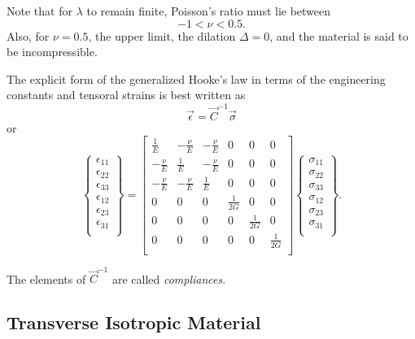 Note that for $\lambda$ to remain finite, Poisson's ratio must lie between
\begin{equation*}
  -1 < \nu < \num{0,5} 
.\end{equation*}
Also, for $\nu = \num{0,5}$, the upper limit, the dilation $\Delta = 0$, and the material is said to be incompressible.

The explicit form of the generalized Hooke's law in terms of the engineering constants and tensoral strains is best written as
\begin{equation*}
  \Vec{\epsilon} = \Vec{C}^{-1} \Vec{\sigma}
\end{equation*}
or
\begin{equation*}
  \left\{ \begin{array}{cccccc}
    \epsilon_{11}\\
  \epsilon_{22}\\
  \epsilon_{33}\\
  \epsilon_{12}\\
  \epsilon_{23}\\
  \epsilon_{31}\\
  \end{array} \right\} = \begin{bmatrix}
    \frac{1}{E} & - \frac{\nu}{E} & - \frac{\nu}{E} & 0 & 0 & 0\\
  - \frac{\nu}{E} & \frac{1}{E} & - \frac{\nu}{E} & 0 & 0 & 0\\
  -\frac{\nu}{E} & -\frac{\nu}{E} & \frac{1}{E} & 0 & 0 & 0\\
  0 & 0 & 0 & \frac{1}{2G} & 0 & 0\\
  0 & 0 & 0 & 0 & \frac{1}{2G} & 0\\
  0 & 0 & 0 & 0 & 0 & \frac{1}{2G}\\
  \end{bmatrix} \left\{ \begin{array}{cccccc}
    \sigma_{11}\\
  \sigma_{22}\\
  \sigma_{33}\\
  \sigma_{12}\\
  \sigma_{23}\\
  \sigma_{31}\\
  \end{array} \right\}
.\end{equation*}

The elements of $\Vec{C}^{-1}$ are called \textit{compliances}.

\subsection{Transverse Isotropic Material}

